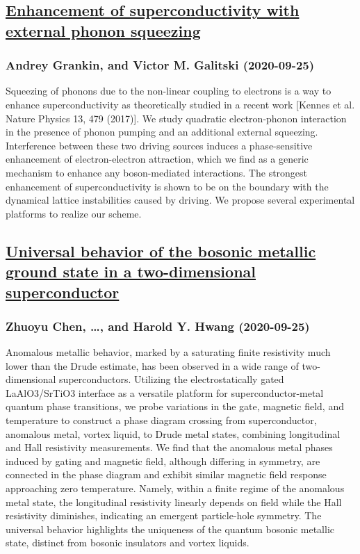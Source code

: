 \subsection*{\href{http://arxiv.org/abs/2009.12428v1}{Enhancement of superconductivity with external phonon squeezing}}
\subsubsection*{Andrey Grankin, and Victor M. Galitski (2020-09-25)}
Squeezing of phonons due to the non-linear coupling to electrons is a way to
enhance superconductivity as theoretically studied in a recent work [Kennes et
al. Nature Physics 13, 479 (2017)]. We study quadratic electron-phonon
interaction in the presence of phonon pumping and an additional external
squeezing. Interference between these two driving sources induces a
phase-sensitive enhancement of electron-electron attraction, which we find as a
generic mechanism to enhance any boson-mediated interactions. The strongest
enhancement of superconductivity is shown to be on the boundary with the
dynamical lattice instabilities caused by driving. We propose several
experimental platforms to realize our scheme.

\subsection*{\href{http://arxiv.org/abs/2009.12403v1}{Universal behavior of the bosonic metallic ground state in a  two-dimensional superconductor}}
\subsubsection*{Zhuoyu Chen, \dots, and Harold Y. Hwang (2020-09-25)}
Anomalous metallic behavior, marked by a saturating finite resistivity much
lower than the Drude estimate, has been observed in a wide range of
two-dimensional superconductors. Utilizing the electrostatically gated
LaAlO3/SrTiO3 interface as a versatile platform for superconductor-metal
quantum phase transitions, we probe variations in the gate, magnetic field, and
temperature to construct a phase diagram crossing from superconductor,
anomalous metal, vortex liquid, to Drude metal states, combining longitudinal
and Hall resistivity measurements. We find that the anomalous metal phases
induced by gating and magnetic field, although differing in symmetry, are
connected in the phase diagram and exhibit similar magnetic field response
approaching zero temperature. Namely, within a finite regime of the anomalous
metal state, the longitudinal resistivity linearly depends on field while the
Hall resistivity diminishes, indicating an emergent particle-hole symmetry. The
universal behavior highlights the uniqueness of the quantum bosonic metallic
state, distinct from bosonic insulators and vortex liquids.

